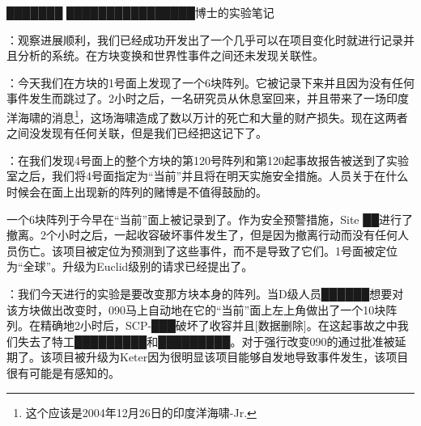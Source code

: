 ███████ ████████████████博士的实验笔记

：观察进展顺利，我们已经成功开发出了一个几乎可以在项目变化时就进行记录并且分析的系统。在方块变换和世界性事件之间还未发现关联性。

：今天我们在方块的1号面上发现了一个6块阵列。它被记录下来并且因为没有任何事件发生而跳过了。2小时之后，一名研究员从休息室回来，并且带来了一场印度洋海啸的消息\footnote{这个应该是2004年12月26日的印度洋海啸-Jr.}，这场海啸造成了数以万计的死亡和大量的财产损失。现在这两者之间没发现有任何关联，但是我们已经把这记下了。

：在我们发现4号面上的整个方块的第120号阵列和第120起事故报告被送到了实验室之后，我们将4号面指定为“当前”并且将在明天实施安全措施。人员关于在什么时候会在面上出现新的阵列的赌博是不值得鼓励的。

一个6块阵列于今早在“当前”面上被记录到了。作为安全预警措施，Site ██进行了撤离。2个小时之后，一起收容破坏事件发生了，但是因为撤离行动而没有任何人员伤亡。该项目被定位为预测到了这些事件，而不是导致了它们。1号面被定位为“全球”。升级为Euclid级别的请求已经提出了。

：我们今天进行的实验是要改变那方块本身的阵列。当D级人员██████想要对该方块做出改变时，090马上自动地在它的“当前”面上左上角做出了一个10块阵列。在精确地2小时后，SCP-███破坏了收容并且{[}数据删除]。在这起事故之中我们失去了特工█████████和█████████。对于强行改变090的通过批准被延期了。该项目被升级为Keter因为很明显该项目能够自发地导致事件发生，该项目很有可能是有感知的。
